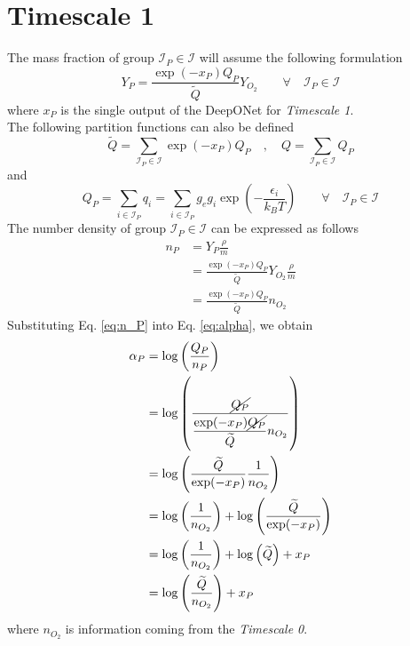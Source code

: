 \documentclass{article}
\begin{document}
	\section{Timescale 1}
	The mass fraction of group $\mathcal{I}_P\in\mathcal{I}$ will assume the following formulation
	\begin{equation*}
		Y_P=\frac{\exp(-x_P)Q_P}{\widetilde{Q}}Y_{O_2}\qquad\forall\quad\mathcal{I}_P\in\mathcal{I}
	\end{equation*}
	where $x_P$ is the single output of the DeepONet for \textit{Timescale 1}.\\
	The following partition functions can also be defined
	\begin{equation*}
		\widetilde{Q}=\sum_{\mathcal{I}_P\in \mathcal{I}} \exp(-x_P)Q_P
		\quad,\quad
		Q=\sum_{\mathcal{I}_P\in \mathcal{I}} Q_P
	\end{equation*}
	and
	\begin{equation*}
		Q_P=\sum_{i\in\mathcal{I}_P}q_i=\sum_{i\in\mathcal{I}_P}g_eg_i\exp\left(-\frac{\epsilon_i}{k_BT}\right)
		\qquad\forall\quad\mathcal{I}_P\in\mathcal{I}
	\end{equation*}
	The number density of group $\mathcal{I}_P\in\mathcal{I}$ can be expressed as follows
	\begin{align}\label{eq:n_P}
		n_P&=Y_P\frac{\rho}{m}\nonumber\\
		&=\frac{\exp(-x_P)Q_P}{\widetilde{Q}}Y_{O_2}\frac{\rho}{m}\nonumber\\
		&=\frac{\exp(-x_P)Q_P}{\widetilde{Q}}n_{O_2}
	\end{align}
	Substituting Eq. \eqref{eq:n_P} into Eq. \eqref{eq:alpha}, we obtain
	\begin{align*}
		\alpha_P&=\log\left(\frac{Q_P}{n_P}\right)\\
		&=\log\left(\frac{\cancel{Q_P}}{\dfrac{\exp(-x_P)\cancel{Q_P}}{\widetilde{Q}}n_{O_2}}\right)\\
		&=\log\left(\frac{\widetilde{Q}}{\exp(-x_P)}\frac{1}{n_{O_2}}\right)\\
		&=\log\left(\frac{1}{n_{O_2}}\right)+\log\left(\frac{\widetilde{Q}}{\exp(-x_P)}\right)\\
		&=\log\left(\frac{1}{n_{O_2}}\right)+\log\left(\widetilde{Q}\right)+x_P\\
		&=\log\left(\frac{\widetilde{Q}}{n_{O_2}}\right)+x_P
	\end{align*}
	where $n_{O_2}$ is information coming from the \textit{Timescale 0}.
\end{document}
